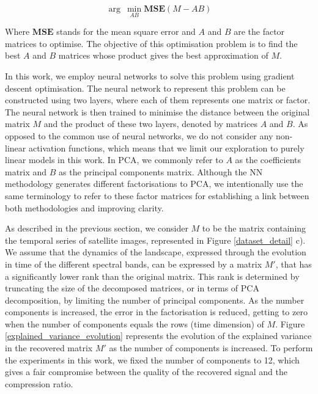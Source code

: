 \documentclass[essd, manuscript]{copernicus}
\begin{document}
$$
\arg\:\min_{AB} \mathbf{MSE}(M-AB)
$$

Where $\mathbf{MSE}$ stands for the mean square error and $A$ and $B$ are the factor matrices to optimise. The objective of this optimisation problem is to find the best $A$ and $B$ matrices whose product gives the best approximation of $M$.

In this work, we employ neural networks to solve this problem using gradient descent optimisation. The neural network to represent this problem can be constructed using two layers, where each of them represents one matrix or factor. The neural network is then trained to minimise the distance between the original matrix $M$ and the product of these two layers, denoted by matrices $A$ and $B$. As opposed to the common use of neural networks, we do not consider any non-linear activation functions, which means that we limit our exploration to purely linear models in this work. In PCA, we commonly refer to $A$ as the coefficients matrix and $B$ as the principal components matrix. Although the NN methodology generates different factorisations to PCA, we intentionally use the same terminology to refer to these factor matrices for establishing a link between both methodologies and improving clarity.

As described in the previous section, we consider $M$ to be the matrix containing the temporal series of satellite images, represented in Figure \ref{dataset_detail} c). We assume that the dynamics of the landscape, expressed through the evolution in time of the different spectral bands, can be expressed by a matrix $M'$, that has a significantly lower rank than the original matrix. This rank is determined by truncating the size of the decomposed matrices, or in terms of PCA decomposition, by limiting the number of principal components. As the number components is increased, the error in the factorisation is reduced, getting to zero when the number of components equals the rows (time dimension) of $M$. Figure \ref{explained_variance_evolution} represents the evolution of the explained variance in the recovered matrix $M'$ as the number of components is increased. To perform the experiments in this work, we fixed the number of components to 12, which gives a fair compromise between the quality of the recovered signal and the compression ratio. 
\end{document}
